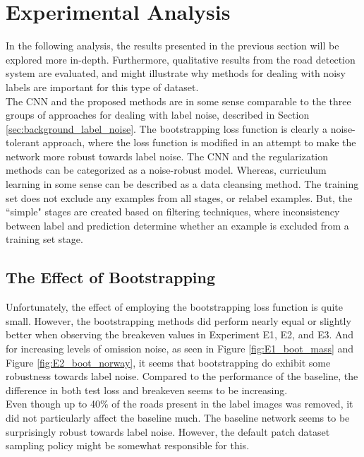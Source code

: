 \section{Experimental Analysis}
\label{sec:Discussion}
In the following analysis,  the results presented in the previous section will be explored more in-depth. Furthermore, qualitative results from the road detection system are evaluated, and might illustrate why methods for dealing with noisy labels are important for this type of dataset.\\

The \ac{CNN} and the proposed methods are in some sense comparable to the three groups of approaches for dealing with label noise, described in Section \ref{sec:background_label_noise}. The bootstrapping loss function is clearly a noise-tolerant approach, where the loss function is modified in an attempt to make the network more robust towards label noise. The \ac{CNN} and the regularization methods can be categorized as a noise-robust model. Whereas, curriculum learning in some sense can be described as a data cleansing method. The training set does not exclude any examples from all stages, or relabel examples. But, the ``simple" stages are created based on filtering techniques, where inconsistency between label and prediction determine  whether an example is excluded from a training set stage.  \\

\subsection{The Effect of Bootstrapping}
Unfortunately, the effect of employing the bootstrapping loss function is quite small. However, the bootstrapping methods did perform nearly equal or slightly better when observing the breakeven values in Experiment E1, E2, and E3. And for increasing levels of omission noise,  as seen in Figure \ref{fig:E1_boot_mass} and Figure \ref{fig:E2_boot_norway}, it seems that bootstrapping do exhibit some robustness towards label noise. Compared to the performance of the baseline, the difference in both test loss and breakeven seems to be increasing.  \\

Even though up to 40\% of the roads present in the label images was removed, it did not particularly affect the baseline much. The baseline network seems to be surprisingly robust towards label noise. However, the default patch dataset sampling policy might be somewhat responsible for this.\\

